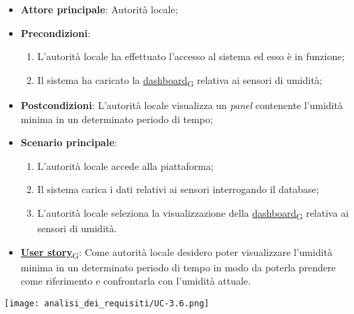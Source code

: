 \begin{itemize}
	\item \textbf{Attore principale}: Autorità locale;
	\item \textbf{Precondizioni}:
	      \begin{enumerate}
		      \item L'autorità locale ha effettuato l'accesso al sistema ed esso è in funzione;
		      \item Il sistema ha caricato la \href{https://7last.github.io/docs/rtb/documentazione-interna/glossario\#dashboard}{dashboard\textsubscript{G}} relativa ai sensori di umidità;
	      \end{enumerate}
	\item \textbf{Postcondizioni}: L'autorità locale visualizza un \textit{panel} contenente l'umidità minima in un determinato periodo di tempo;
	\item \textbf{Scenario principale}:
	      \begin{enumerate}
		      \item L'autorità locale accede alla piattaforma;
		      \item Il sistema carica i dati relativi ai sensori interrogando il database;
		      \item L'autorità locale seleziona la visualizzazione della \href{https://7last.github.io/docs/rtb/documentazione-interna/glossario\#dashboard}{dashboard\textsubscript{G}} relativa ai sensori di umidità.
	      \end{enumerate}
	\item \href{https://7last.github.io/docs/rtb/documentazione-interna/glossario\#user-story}{\textbf{User story}\textsubscript{G}}:
	      Come autorità locale desidero poter visualizzare l'umidità minima in un determinato periodo di tempo
	      in modo da poterla prendere come riferimento e confrontarla con l'umidità attuale.
\end{itemize}
\begin{center}
	\texttt{[image: analisi\_dei\_requisiti/UC-3.6.png]}
\end{center}

